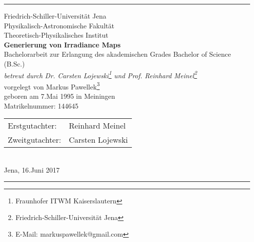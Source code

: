 \newcommand{\vrulefill}{\par\leaders\hbox{$\cdot$}\vfill}

\begin{titlepage}
	\thispagestyle{empty}
	\noindent

	\begin{minipage}{\textwidth}
		\rule{1.5pt}{0.3\textheight}%

		\vspace{5mm}
		\noindent
		{\Large Friedrich-Schiller-Universität Jena \\ Physikalisch-Astronomische Fakultät \\ Theoretisch-Physikalisches Institut \\[2\baselineskip]}
		{\Huge\bfseries Generierung von Irradiance Maps}\\[2\baselineskip]
		{\large Bachelorarbeit zur Erlangung des akademischen Grades Bachelor of Science (B.Sc.)\\}
		{\large \textit{betreut durch Dr. Carsten Lojewski\footnote{Fraunhofer ITWM Kaiserslautern} und Prof. Reinhard Meinel\footnote{Friedrich-Schiller-Universität Jena}}}\\[4\baselineskip]
		{\Large vorgelegt von Markus Pawellek}\footnote{E-Mail: markuspawellek@gmail.com} \\[\baselineskip]
		{\large geboren am 7.Mai 1995 in Meiningen}\\
		{\large Matrikelnummer: 144645}

		\vspace{0.1\textheight} %
		\noindent
		\begin{tabular}{ll}
			\Large Erstgutachter: & \Large Reinhard Meinel \\
			\Large Zweitgutachter: & \Large Carsten Lojewski
		\end{tabular}
		\\[\baselineskip] %
		\hspace{\textwidth} Jena, 16.Juni 2017
		\vspace{5mm} \\
		\rule{1.5pt}{0.15\textheight}
	\end{minipage}

	\setcounter{page}{1}
\end{titlepage}
